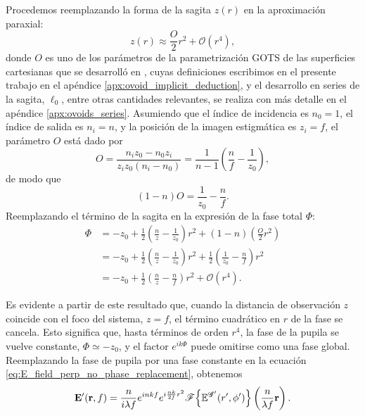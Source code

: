 Procedemos reemplazando la forma de la sagita $z(r)$ en la aproximación paraxial:
\begin{equation}
    z(r)
    \approx
    \frac{O}{2}r^2
    +
    \mathcal{O}(r^4),
\end{equation}
donde $O$ es uno de los parámetros de la parametrización GOTS de las superficies cartesianas que se desarrolló en \cite{singlet2020}, cuyas definiciones escribimos en el presente trabajo en el apéndice \ref{apx:ovoid_implicit_deduction}, y el desarrollo en series de la sagita, $\ell_0$, entre otras cantidades relevantes, se realiza con más detalle en el apéndice \ref{apx:ovoids_series}. Asumiendo que el índice de incidencia es $n_0=1$, el índice de salida es $n_i=n$, y la posición de la imagen estigmática es $z_i=f$, el parámetro $O$ está dado por
\begin{equation}
    O
    =
    \frac{n_i z_0 - n_0 z_i}{z_i z_0 (n_i - n_0)}
    =
    \frac{1}{n - 1}
    \left(
    \frac{n}{f}
    -
    \frac{1}{z_0}
    \right),
\end{equation}
de modo que
\begin{equation}
    (1-n)O
    =
    \frac{1}{z_0}
    -
    \frac{n}{f}.
\end{equation}
Reemplazando el término de la sagita en la expresión de la fase total $\Phi$:
\begin{align}
    \Phi
    &=
    -z_0
    +
    \frac{1}{2}
    \left(
    \frac{n}{z}
    -
    \frac{1}{z_0}
    \right)r^2
    +
    (1-n)
    \left(
    \frac{O}{2}r^2
    \right)
    \nonumber
    \\
    &=
    -z_0
    +
    \frac{1}{2}
    \left(
    \frac{n}{z}
    -
    \frac{1}{z_0}
    \right)r^2
    +
    \frac{1}{2}
    \left(
    \frac{1}{z_0}
    -
    \frac{n}{f}
    \right)r^2
    \nonumber
    \\
    &=
    -z_0
    +
    \frac{1}{2}
    \left(
    \frac{n}{z}
    -
    \frac{n}{f}
    \right)r^2
    +
    \mathcal{O}(r^4).
\end{align}

Es evidente a partir de este resultado que, cuando la distancia de observación $z$ coincide con el foco del sistema, $z=f$, el término cuadrático en $r$ de la fase se cancela. Esto significa que, hasta términos de orden $r^4$, la fase de la pupila se vuelve constante, $\Phi\simeq -z_0$, y el factor $e^{ik\Phi}$ puede omitirse como una fase global. Reemplazando la fase de pupila por una fase constante en la ecuación \eqref{eq:E_field_perp_no_phase_replacement}, obtenemos
\begin{equation}
  \vb E'(\vb r, f)
  =
  \frac{n}{i\lambda f}e^{inkf}e^{i\frac{nk}{2f}r^2}
  \mathscr F
  \Big\{
  \mathbb E^{\mathscr G'}(r', \phi')
  \Big\}
  \left(
  \frac{n}{\lambda f}\vb r
  \right).
  \label{eq:E_field_pupil_phase_and_TT}
\end{equation}

